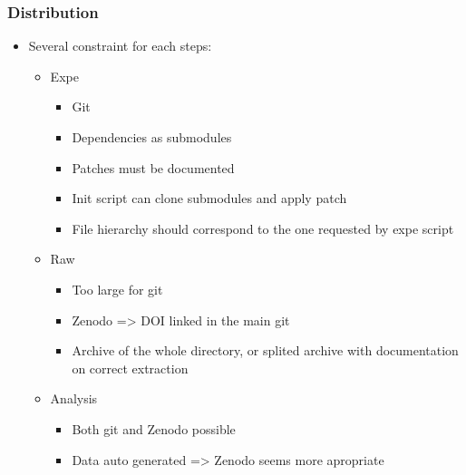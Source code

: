 \subsubsection{Distribution}

\begin{itemize}
    \item Several constraint for each steps:
        \begin{itemize}
            \item Expe
                \begin{itemize}
                    \item Git
                    \item Dependencies as submodules
                    \item Patches must be documented
                    \item Init script can clone submodules and apply patch
                    \item File hierarchy should correspond to the one requested by expe script
                \end{itemize}
            \item Raw
                \begin{itemize}
                    \item Too large for git
                    \item Zenodo => DOI linked in the main git
                    \item Archive of the whole directory, or splited archive with documentation on correct extraction
                \end{itemize}
            \item Analysis
                \begin{itemize}
                    \item Both git and Zenodo possible
                    \item Data auto generated => Zenodo seems more apropriate
                \end{itemize}
        \end{itemize}
\end{itemize}

